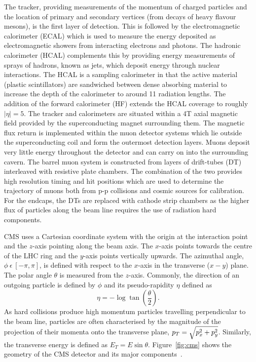 The tracker, providing measurements of the momentum of charged particles and the location of 
primary and secondary vertices (from decays of heavy flavour mesons), is the first layer of detection.
This is followed by the electromagnetic calorimeter (ECAL) which is used to measure
the energy deposited as electromagnetic showers from interacting electrons and photons. 
The hadronic calorimeter (HCAL) complements this by providing energy measurements of 
sprays of hadrons, known as jets, which deposit energy through nuclear interactions. 
The HCAL is a sampling calorimeter in that the active material (plastic scintillators)
are sandwiched between dense absorbing material to increase the depth of the calorimeter to
around 11 radiation lengths. The addition of the forward calorimeter (HF) extends the HCAL
coverage to roughly $|\eta|=5$.  
The tracker and calorimeters are situated within a 4T axial magnetic field 
provided by the superconducting magnet surrounding them.
The magnetic flux return is implemented within the  muon detector systems which lie outside 
the superconducting coil and form the outermost detection layers. Muons deposit very little energy 
throughout the detector and can carry on into the surrounding cavern.
The barrel muon system is constructed from layers of drift-tubes (DT) interleaved with 
resistive plate chambers. The combination of the two provides high resolution
timing and hit positions which are used to determine the trajectory of muons both from
p-p collisions and cosmic sources for calibration. For the endcaps, the DTs are replaced
with cathode strip chambers as the higher flux of particles along the beam line
requires the use of radiation hard components.

CMS uses a Cartesian coordinate system with the origin at the 
interaction point and the $z$-axis pointing along the beam axis. The $x$-axis points towards 
the centre of the LHC ring and the $y$-axis points vertically upwards. The azimuthal angle, 
$\phi~\epsilon~[-\pi,\pi]$, is defined with respect to the $x$-axis in the 
transverse ($x-y$) plane. The polar angle $\theta$ is measured from the $z$-axis. Commonly,
the direction of an outgoing particle is defined by $\phi$ and its pseudo-rapidity $\eta$ 
defined as 
\begin{equation}
	\eta=-\log \tan \left( \frac{\theta}{2} \right).
\end{equation}
As hard collisions produce high momentum particles travelling perpendicular to the beam line, 
particles are often characterised
by the magnitude of the projection of their momenta onto the transverse plane, 
$p_{T}=\sqrt{p_{x}^{2}+p_{y}^{2}}$.
Similarly, the transverse energy is defined as $E_{T}=E\sin\theta$.
Figure~\ref{fig:cms} shows the geometry of the CMS detector and its major components~\citep{cmsdetector}. 

